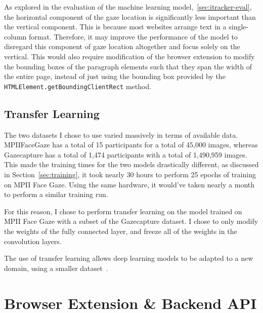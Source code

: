 \documentclass{report}
\begin{document}
As explored in the evaluation of the machine learning model,~\autoref{sec:itracker-eval}, the horizontal component of the gaze location is significantly less important than the vertical component. This is because most websites arrange text in a single-column format. Therefore, it may improve the performance of the model to disregard this component of gaze location altogether and focus solely on the vertical. This would also require modification of the browser extension to modify the bounding boxes of the paragraph elements such that they span the width of the entire page, instead of just using the bounding box provided by the \texttt{HTMLElement.getBoundingClientRect} method.


\subsection{Transfer Learning}

The two datasets I chose to use varied massively in terms of available data. MPIIFaceGaze has a total of 15 participants for a total of 45,000 images, whereas Gazecapture has a total of 1,474 participants with a total of 1,490,959 images. This made the training times for the two models drastically different, as discussed in Section~\ref{sec:training}, it took nearly 30 hours to perform 25 epochs of training on MPII Face Gaze. Using the same hardware, it would've taken nearly a month to perform a similar training run. 

For this reason, I chose to perform transfer learning on the model trained on MPII Face Gaze with a subset of the Gazecapture dataset. I chose to only modify the weights of the fully connected layer, and freeze all of the weights in the convolution layers. 

The use of transfer learning allows deep learning models to be adapted to a new domain, using a smaller dataset~\cite{koehrsen2018transfer}. 


\section{Browser Extension \& Backend API}
\end{document}
